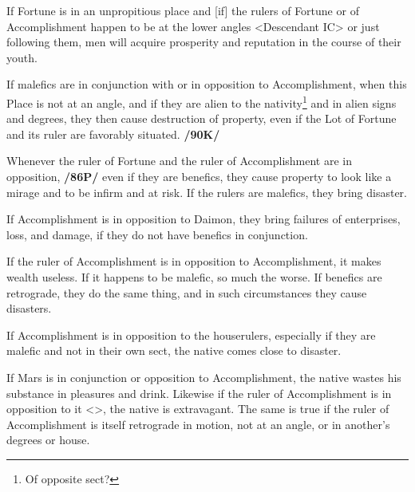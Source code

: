 If Fortune is in an unpropitious place and [if] the rulers of Fortune or of Accomplishment happen to be at the lower angles <Descendant IC> or just following them, men will acquire prosperity and reputation in the course of their youth. 

If malefics are in conjunction with or in opposition to Accomplishment, when this Place is not at an angle, and if they are alien to the nativity\footnote{Of opposite sect?} and in alien signs and degrees, they then cause destruction of property, even if the Lot of Fortune and its ruler are favorably situated. \textbf{/90K/}

Whenever the ruler of Fortune and the ruler of Accomplishment are in opposition, \textbf{/86P/} even if they are benefics, they cause property to look like a mirage and to be infirm and at risk. If the rulers are malefics, they bring disaster. 

If Accomplishment is in opposition to Daimon, they bring failures of enterprises, loss, and damage, if they do not have benefics in conjunction. 

If the ruler of Accomplishment is in opposition to Accomplishment, it makes wealth useless. If it happens to be malefic, so much the worse. \mnbm If benefics are retrograde, they do the same thing, and in such circumstances they cause disasters. 

If Accomplishment is in opposition to the houserulers, especially if they are malefic and not in their own sect, the native comes close to disaster. 

If Mars is in conjunction or opposition to Accomplishment, the native wastes his substance in pleasures and drink. Likewise if the ruler of Accomplishment is in
opposition to it <\Mars>, the native is extravagant. The same is true if the ruler of Accomplishment is itself retrograde in motion, not at an angle, or in another’s degrees or house.

\newpage